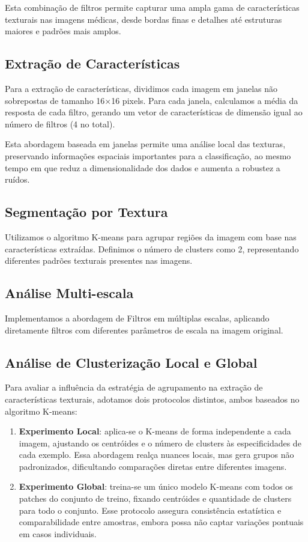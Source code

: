 \documentclass[sigconf,nonacm]{acmart}
\begin{document}
Esta combinação de filtros permite capturar uma ampla gama de características texturais nas imagens médicas, desde bordas finas e detalhes até estruturas maiores e padrões mais amplos.

\subsection{Extração de Características}

Para a extração de características, dividimos cada imagem em janelas não sobrepostas de tamanho 16×16 pixels. Para cada janela, calculamos a média da resposta de cada filtro, gerando um vetor de características de dimensão igual ao número de filtros (4 no total).

Esta abordagem baseada em janelas permite uma análise local das texturas, preservando informações espaciais importantes para a classificação, ao mesmo tempo em que reduz a dimensionalidade dos dados e aumenta a robustez a ruídos.

\subsection{Segmentação por Textura}

Utilizamos o algoritmo K-means para agrupar regiões da imagem com base nas características extraídas. Definimos o número de clusters como 2, representando diferentes padrões texturais presentes nas imagens.

\subsection{Análise Multi-escala}

Implementamos a abordagem de Filtros em múltiplas escalas, aplicando diretamente filtros com diferentes parâmetros de escala na imagem original.

\subsection{Análise de Clusterização Local e Global}
Para avaliar a influência da estratégia de agrupamento na extração de características texturais, adotamos dois protocolos distintos, ambos baseados no algoritmo K-means:
\begin{enumerate}
  \item \textbf{Experimento Local}: aplica-se o K-means de forma independente a cada imagem, ajustando os centróides e o número de clusters às especificidades de cada exemplo. Essa abordagem realça nuances locais, mas gera grupos não padronizados, dificultando comparações diretas entre diferentes imagens.
  \item \textbf{Experimento Global}: treina-se um único modelo K-means com todos os patches do conjunto de treino, fixando centróides e quantidade de clusters para todo o conjunto. Esse protocolo assegura consistência estatística e comparabilidade entre amostras, embora possa não captar variações pontuais em casos individuais.
\end{enumerate}
\end{document}

